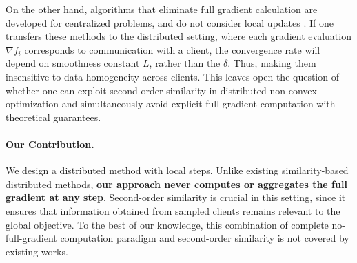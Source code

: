 \documentclass{article}
\begin{document}
On the other hand, algorithms that eliminate full gradient calculation are developed for centralized problems, and do not consider local updates \cite{li2021zerosarah, medyakov2025variance}. If one transfers these methods to the distributed setting, where each gradient evaluation $\nabla f_i$ corresponds to communication with a client, the convergence rate will depend on smoothness constant $L$, rather than the $\delta$. Thus, making them insensitive to data homogeneity across clients.  This leaves open the question of whether one 
can exploit second-order similarity in distributed non-convex optimization and simultaneously avoid explicit full-gradient computation with 
theoretical guarantees.


\paragraph{Our Contribution.} \label{contribution}
We design a distributed method with local steps. Unlike existing similarity-based distributed methods, \textbf{our approach never computes or aggregates the full gradient at any step}. Second-order similarity is crucial in this setting, since it ensures that information obtained from sampled clients remains relevant to the global objective. To the best of our knowledge, this combination of complete no-full-gradient computation paradigm and second-order similarity is not covered by existing works.
\end{document}
